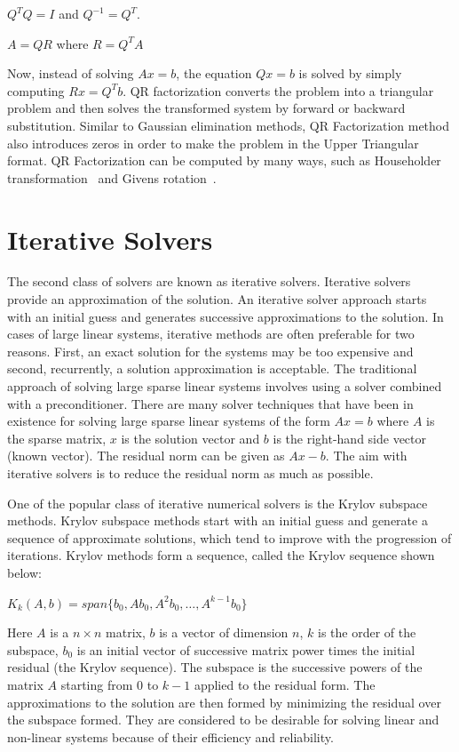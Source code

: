 \begin{center}
$Q^{T}Q = I$ and $Q^{-1} = Q^{T}$. 


$A = QR$ where $R = Q^{T}A$

\end{center}

Now, instead of solving $Ax = b$, the equation $Qx=b$ is solved by simply computing $Rx = Q^{T}b$. QR factorization converts the problem into a triangular problem and then solves the transformed system by forward or backward substitution. Similar to Gaussian elimination methods, QR Factorization method also introduces zeros in order to make the problem in the Upper Triangular format. QR Factorization can be computed by many ways, such as Householder transformation~\cite{heath} and Givens rotation~\cite{golub}. 

\section{Iterative Solvers}
The second class of solvers are known as iterative solvers. Iterative solvers provide an approximation of the solution. An iterative solver approach starts with an initial guess and generates successive approximations to the solution. In cases of large linear systems, iterative methods are often preferable for two reasons. First, an exact solution for the systems may be too expensive and second, recurrently, a solution approximation is acceptable. The traditional approach of solving large sparse linear systems involves using a solver combined with a preconditioner. There are many solver techniques that have been in existence for solving large sparse linear systems of the form $Ax = b$ where $A$ is the sparse matrix, $x$ is the solution vector and $b$ is the right-hand side vector (known vector). The residual norm can be given as $Ax - b$. The aim with iterative solvers is to reduce the residual norm as much as possible. 

One of the popular class of iterative numerical solvers is the Krylov subspace methods. Krylov subspace methods start with an initial guess and generate a sequence of approximate solutions, which tend to improve with the progression of iterations. Krylov methods form a sequence, called the Krylov sequence shown below: 

${K}_{k}(A,b)= span\{b_0,Ab_0,A^{2}b_0,\ldots,A^{k-1}b_0\}$

Here $A$ is a $n \times n$ matrix, $b$ is a vector of dimension $n$, $k$ is the order of the subspace, $b_0$ is an initial vector of successive matrix power times the initial residual (the Krylov sequence). The subspace is the successive powers of the matrix $A$ starting from $0$ to $k-1$ applied to the residual form. The approximations to the solution are then formed by minimizing the residual over the subspace formed. They are considered to be desirable for solving linear and non-linear systems because of their efficiency and reliability. 

